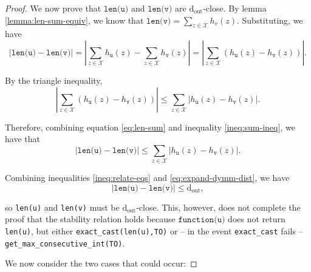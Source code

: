 \documentclass[11pt,letterpaper]{article}
\newcommand{\dout}{\mathrm{d_{out}}}
\theoremstyle{definition}
\begin{document}
\begin{proof}
We now prove that $\texttt{len(u)}$ and $\texttt{len(v)}$ are $\dout$-close. By lemma \ref{lemma:len-sum-equiv}, we know that $\texttt{len(v)} = \sum_{z\in\mathcal{X}} h_v(z)$. Substituting, we have
\begin{equation}
\label{eq:len-sum}
    |\texttt{len(u)} - \texttt{len(v)}|
    =
    |\sum_{z\in \mathcal{X}} h_{\texttt{u}}(z) - \sum_{z\in \mathcal{X}} h_{\texttt{v}}(z)|
    =
    |\sum_{z\in \mathcal{X}}\left(h_{\texttt{u}}(z) - h_{\texttt{v}}(z)\right)|.
\end{equation}

By the triangle inequality,
\begin{equation}
\label{ineq:sum-ineq}
    |\sum_{z\in \mathcal{X}}\left(h_{\texttt{u}}(z) - h_{\texttt{v}}(z)\right)|
    \leq 
    \sum_{z\in \mathcal{X}}|h_{\texttt{u}}(z) - h_{\texttt{v}}(z)|.
\end{equation}

Therefore, combining equation \ref{eq:len-sum} and inequality \ref{ineq:sum-ineq}, we have that
\begin{equation}
\label{ineq:relate-eqs}
    |\texttt{len(u)} - \texttt{len(v)}|
    \leq 
    \sum_{z\in \mathcal{X}}|h_{\texttt{u}}(z) - h_{\texttt{v}}(z)|.
\end{equation}

Combining inequalities \ref{ineq:relate-eqs} and \ref{eq:expand-dymm-dist}, we have
\begin{equation}
\label{ineq:dout-close}
    |\texttt{len(u)} - \texttt{len(v)}|
    \leq
    \dout,
\end{equation}

so \texttt{len(u)} and \texttt{len(v)} must be $\dout$-close. This, however, does not complete the proof that the stability relation holds because $\texttt{function(u)}$ does not return \texttt{len(u)}, but either \texttt{exact\_cast(len(u),TO)} or -- in the event \texttt{exact\_cast} fails -- \texttt{get\_max\_consecutive\_int(TO)}.

We now consider the two cases that could occur:


\end{proof}
\end{document}
